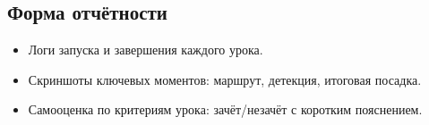 \subsection*{Форма отчётности}
\begin{itemize}
\item Логи запуска и завершения каждого урока.
\item Скриншоты ключевых моментов: маршрут, детекция, итоговая посадка.
\item Самооценка по критериям урока: зачёт/незачёт с коротким пояснением.
\end{itemize}
